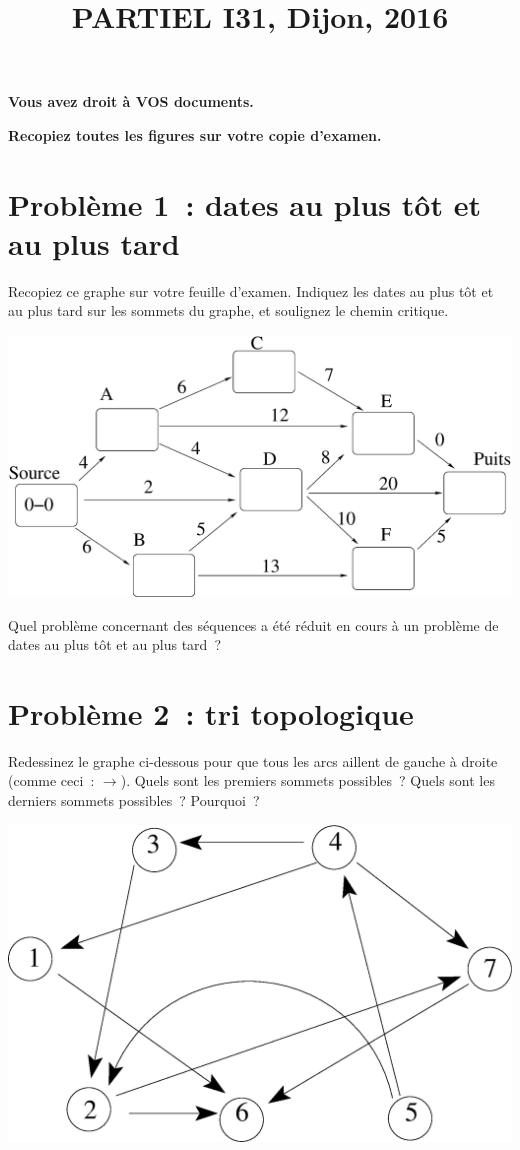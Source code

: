 \documentclass[11pt]{article}
\begin{document}
\title{PARTIEL I31, Dijon, 2016}
\date{}\maketitle

{\bf Vous avez droit à VOS documents.}

{\bf Recopiez toutes les figures sur votre copie d'examen.}

\section{Problème 1~: dates au plus tôt et au plus tard}

Recopiez ce graphe sur votre feuille d'examen. Indiquez les dates au plus tôt et au plus tard sur les sommets du graphe, 
et soulignez le chemin critique. 

\begin{center}
\includegraphics[width=0.7\linewidth]{critique2.eps}
\end{center}

Quel problème concernant des séquences a été réduit en cours à un problème de
dates au plus tôt et au plus tard~?

\section{Problème 2~: tri topologique}
Redessinez le graphe ci-dessous pour que tous les arcs aillent de gauche à droite (comme ceci~: $\rightarrow$).  Quels sont les premiers sommets possibles~?
Quels sont les derniers sommets possibles~? Pourquoi~?
\begin{center}
\includegraphics[width=0.6\linewidth]{tritopologique.eps}
\end{center}
\end{document}
